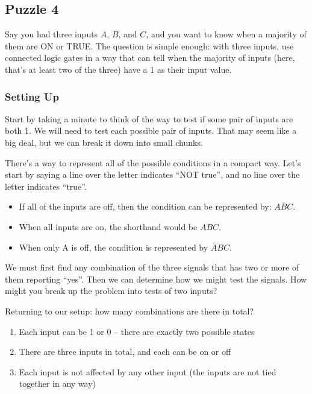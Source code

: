 \subsection*{Puzzle 4}

Say you had three inputs $A$, $B$, and $C$, and you want to know when a majority of them are ON or TRUE.
The question is simple enough: with three inputs, use connected logic gates in a way that can tell when the majority of inputs (here, that's at least two of the three) have a 1 as their input value.

\subsubsection*{Setting Up}

Start by taking a minute to think of the way to test if some pair of inputs are both 1. We will need to test each possible pair of inputs. That may seem like a big deal, but we can break it down into small chunks.

There's a way to represent all of the possible conditions in a compact way.
Let's start by saying a line over the letter indicates ``NOT true'', and no line over the letter indicates ``true''.
\begin{itemize}
\item If all of the inputs are off, then the condition can be represented by: $\overline{ABC}$. 
\item When all inputs are on, the shorthand would be $ABC$. 
\item When only A is off, the condition is represented by $\overline{A}BC$. 
\end{itemize}

We must first find any combination of the three signals that has two or more of them reporting ``yes''. Then we can determine how we might test the signals. How might you break up the problem into tests of two inputs? 

Returning to our setup: how many combinations are there in total?

\begin{enumerate}
\item Each input can be 1 or 0 -- there are exactly two possible states
\item There are three inputs in total, and each can be on or off
\item Each input is not affected by any other input (the inputs are not tied together in any way)
\end{enumerate}

